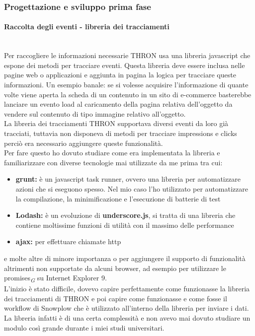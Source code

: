 \documentclass[a4paper, 12pt, twoside, openright]{book}
\newcommand{\gloss}[1]{#1\textsubscript{\textit{\tiny{G}}}}
\begin{document}
\subsubsection{Progettazione e sviluppo prima fase}

\paragraph{Raccolta degli eventi - libreria dei tracciamenti}\mbox{} \\
Per raccogliere le informazioni necessarie THRON usa una libreria javascript che espone dei metodi per tracciare eventi. Questa libreria deve essere inclusa nelle pagine web o applicazioni e aggiunta in pagina la logica per tracciare queste informazioni. Un esempio banale: se si volesse acquisire l'informazione di quante volte viene aperta la scheda di un contenuto in un sito di e-commerce basterebbe lanciare un evento load al caricamento della pagina relativa dell'oggetto da vendere sul contenuto di tipo immagine relativo all'oggetto.\\
La libreria dei tracciamenti THRON supportava diversi eventi da loro già tracciati, tuttavia non disponeva di metodi per tracciare impressions e clicks perciò era necessario aggiungere queste funzionalità.\\
Per fare questo ho dovuto studiare come era implementata la libreria e familiarizzare con diverse tecnologie mai utilizzate da me prima tra cui:
\begin{itemize}
\item \textbf{grunt:} è un javascript task runner, ovvero una libreria per automatizzare azioni che si eseguono spesso. Nel mio caso l'ho utilizzato per automatizzare la compilazione, la minimificazione e l'esecuzione di batterie di test
\item \textbf{Lodash:} è un evoluzione di \textbf{underscore.js}, si tratta di una libreria che contiene moltissime funzioni di utilità con il massimo delle performance
\item \textbf{ajax:} per effettuare chiamate http
\end{itemize}
e molte altre di minore importanza o per aggiungere il supporto di funzionalità altrimenti non supportate da alcuni browser, ad esempio per utilizzare le \gloss{promises} su Internet Explorer 9.\\
L'inizio è stato difficile, dovevo capire perfettamente come funzionasse la libreria dei tracciamenti di THRON e poi capire come funzionasse e come fosse il workflow di Snowplow che è utilizzato all'interno della libreria per inviare i dati. La libreria infatti è di una certa complessità e non avevo mai dovuto studiare un modulo così grande durante i miei studi universitari.\\
\end{document}
